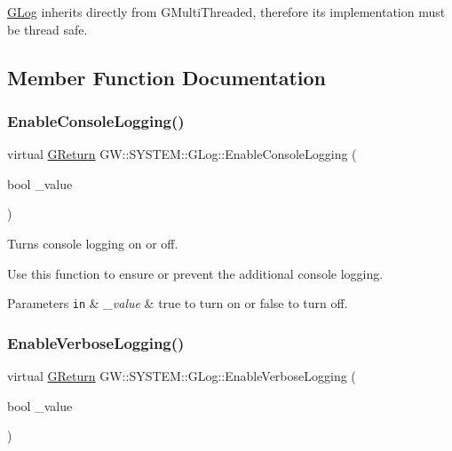 \mbox{\hyperlink{classGW_1_1SYSTEM_1_1GLog}{G\+Log}} inherits directly from G\+Multi\+Threaded, therefore its implementation must be thread safe. 

\subsection{Member Function Documentation}
\mbox{\label{classGW_1_1SYSTEM_1_1GLog_a1eb651aa3d5b6b8baac389be284a569d}} 
\subsubsection{\texorpdfstring{Enable\+Console\+Logging()}{EnableConsoleLogging()}}
{\footnotesize\ttfamily virtual \mbox{\hyperlink{namespaceGW_a67a839e3df7ea8a5c5686613a7a3de21}{G\+Return}} G\+W\+::\+S\+Y\+S\+T\+E\+M\+::\+G\+Log\+::\+Enable\+Console\+Logging (\begin{DoxyParamCaption}\item[{bool}]{\+\_\+value }\end{DoxyParamCaption})\hspace{0.3cm}{\ttfamily [pure virtual]}}



Turns console logging on or off. 

Use this function to ensure or prevent the additional console logging.


\begin{DoxyParams}[1]{Parameters}
\mbox{\tt in}  & {\em \+\_\+value} & true to turn on or false to turn off. \\
\hline
\end{DoxyParams}
\mbox{\label{classGW_1_1SYSTEM_1_1GLog_adea469091bba33b419f7e88a9c2c3049}} 
\subsubsection{\texorpdfstring{Enable\+Verbose\+Logging()}{EnableVerboseLogging()}}
{\footnotesize\ttfamily virtual \mbox{\hyperlink{namespaceGW_a67a839e3df7ea8a5c5686613a7a3de21}{G\+Return}} G\+W\+::\+S\+Y\+S\+T\+E\+M\+::\+G\+Log\+::\+Enable\+Verbose\+Logging (\begin{DoxyParamCaption}\item[{bool}]{\+\_\+value }\end{DoxyParamCaption})\hspace{0.3cm}{\ttfamily [pure virtual]}}



